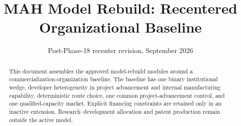 \documentclass[11pt]{article}
\title{MAH Model Rebuild: Recentered Organizational Baseline}
\author{}
\date{Post-Phase-18 recenter revision, September 2026}
\begin{document}
\maketitle

\begin{abstract}
This document assembles the approved model-rebuild modules around a
commercialization-organization baseline. The baseline has one binary
institutional wedge, developer heterogeneity in project advancement and
internal manufacturing capability, deterministic route choice, one common
project-advancement control, and one qualified-capacity market. Explicit
financing constraints are retained only in an inactive extension.
Research--development allocation and patent production remain outside the
active model.
\end{abstract}

\tableofcontents














\end{document}
